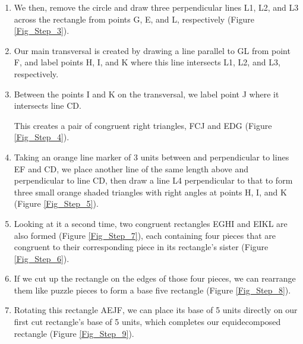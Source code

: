 \documentclass{article}
\begin{document}
\begin{enumerate}
    \item We then, remove the circle and draw three perpendicular lines L1, L2, and L3 across the rectangle from points G, E, and L, respectively (Figure \ref{Fig_Step_3}).
    
    
    \item Our main transversal is created by drawing a line parallel to GL from point F, and label points H, I, and K where this line intersects L1, L2, and L3, respectively.
    
    
    \item Between the points I and K on the transversal, we label point J where it intersects line CD.
    
    This creates a pair of congruent right triangles, FCJ and EDG  (Figure \ref{Fig_Step_4}).
    
    
    \item Taking an orange line marker of 3 units between and perpendicular to lines EF and CD, we place another line of the same length above and perpendicular to line CD, then draw a line L4 perpendicular to that to form three small orange shaded triangles with right angles at points H, I, and K (Figure \ref{Fig_Step_5}).
    
    
    \item Looking at it a second time, two congruent rectangles EGHI and EIKL are also formed (Figure \ref{Fig_Step_7}), each containing four pieces that are congruent to their corresponding piece in its rectangle's sister (Figure \ref{Fig_Step_6}).
    
    \item If we cut up the rectangle on the edges of those four pieces, we can rearrange them like puzzle pieces to form a base five rectangle (Figure \ref{Fig_Step_8}).
    
    \item Rotating this rectangle AEJF, we can place its base of 5 units directly on our first cut rectangle's base of 5 units, which completes our equidecomposed rectangle (Figure \ref{Fig_Step_9}).
    
    
\end{enumerate}
\end{document}
